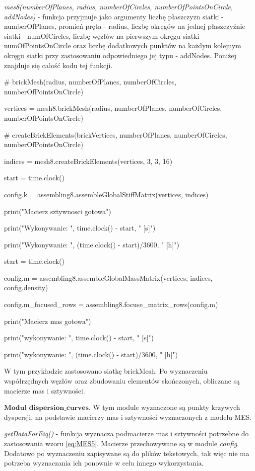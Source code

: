 \textit{mes8(numberOfPlanes, radius, numberOfCircles, numberOfPointsOnCircle, addNodes)} - funkcja przyjmuje jako argumenty liczbę płaszczyzn siatki - numberOfPlanes, promień pręta - radius, liczbę okręgów na jednej płaszczyźnie siatki - numOfCircles, liczbę węzłów na pierwszym okręgu siatki - numOfPointsOnCircle oraz liczbę dodatkowych punktów na każdym kolejnym okręgu siatki przy zastosowaniu odpowiedniego jej typu - addNodes. Poniżej znajduje się całość kodu tej funkcji.

\vspace {3mm}
    \# brickMesh(radius, numberOfPlanes, numberOfCircles, numberOfPointsOnCircle)

    vertices = mesh8.brickMesh(radius, numberOfPlanes, numberOfCircles, numberOfPointsOnCircle)

    \# createBrickElements(brickVertices, numberOfPlanes, numberOfCircles, numberOfPointsOnCircle)

    indices = mesh8.createBrickElements(vertices, 3, 3, 16)

\vspace {3mm}
    start = time.clock()

    config.k = assembling8.assembleGlobalStiffMatrix(vertices, indices)

    print("Macierz sztywnosci gotowa")

    print("Wykonywanie: ", time.clock() - start, " [s]")

    print("Wykonywanie: ", (time.clock() - start)/3600, " [h]")

    start = time.clock()

\vspace {3mm}
    config.m = assembling8.assembleGlobalMassMatrix(vertices, indices, config.density)

    config.m\_focused\_rows = assembling8.focuse\_matrix\_rows(config.m)

    print("Macierz mas gotowa")

    print("wykonywanie: ", time.clock() - start, " [s]")

    print("wykonywanie: ", (time.clock() - start)/3600, " [h]")

\vspace {3mm}
W tym przykładzie zastosowano siatkę brickMesh. Po wyznaczeniu współrzędnych węzłów oraz zbudowaniu elementów skończonych, obliczane są macierze mas i sztywności.

 \( \textbf{Moduł dispersion\_curves} \).
W tym module wyznaczone są punkty krzywych dyspersji, na podstawie macierzy mas i sztywności wyznaczonych z modelu MES.

\vspace {3mm}
\textit{getDataForEiq()} - funkcja wyznacza podmacierze mas i sztywności potrzebne do zastosowania wzoru \ref{eq:MES5}. Macierze przechowywane są w module \textit{config}. Dodatowo po wyznaczeniu zapisywane są do plików tekstowych, tak więc nie ma potrzeba wyznaczania ich ponownie w celu innego wykorzystania.

